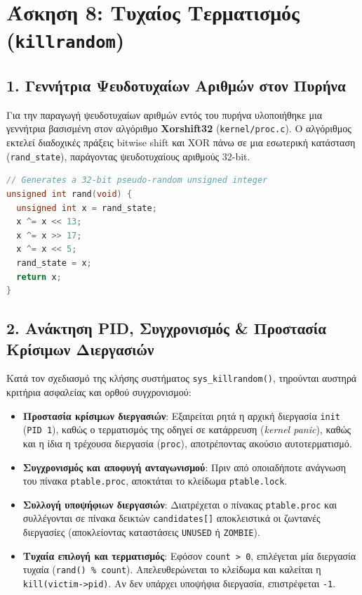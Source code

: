 \documentclass[11pt,a4paper]{article}
\begin{document}
\clearpage
\section{Άσκηση 8: Τυχαίος Τερματισμός (\texttt{killrandom})}


\subsection*{1. Γεννήτρια Ψευδοτυχαίων Αριθμών στον Πυρήνα}
Για την παραγωγή ψευδοτυχαίων αριθμών εντός του πυρήνα υλοποιήθηκε μια γεννήτρια βασισμένη στον αλγόριθμο \textbf{Xorshift32} (\texttt{kernel/proc.c}). 
Ο αλγόριθμος εκτελεί διαδοχικές πράξεις bitwise shift και XOR πάνω σε μια εσωτερική κατάσταση (\texttt{rand\_state}), παράγοντας ψευδοτυχαίους αριθμούς 32-bit.

\begin{lstlisting}[language=C, caption={Υλοποίηση του αλγορίθμου Xorshift32 στο kernel/proc.c}]
// Generates a 32-bit pseudo-random unsigned integer
unsigned int rand(void) {
  unsigned int x = rand_state;
  x ^= x << 13;
  x ^= x >> 17;
  x ^= x << 5;
  rand_state = x;
  return x;
}
\end{lstlisting}

\subsection*{2. Ανάκτηση PID, Συγχρονισμός \& Προστασία Κρίσιμων Διεργασιών}
Κατά τον σχεδιασμό της κλήσης συστήματος \texttt{sys\_killrandom()}, τηρούνται αυστηρά κριτήρια ασφαλείας και ορθού συγχρονισμού:

\begin{itemize}
    \item \textbf{Προστασία κρίσιμων διεργασιών}: Εξαιρείται ρητά η αρχική διεργασία \texttt{init} (\texttt{PID 1}), καθώς ο τερματισμός της οδηγεί σε κατάρρευση (\textit{kernel panic}), 
    καθώς και η ίδια η τρέχουσα διεργασία (\texttt{proc}), αποτρέποντας ακούσιο αυτοτερματισμό.
    \item \textbf{Συγχρονισμός και αποφυγή ανταγωνισμού}: Πριν από οποιαδήποτε ανάγνωση του πίνακα \texttt{ptable.proc}, αποκτάται το κλείδωμα \texttt{ptable.lock}. 
    \item \textbf{Συλλογή υποψήφιων διεργασιών}: Διατρέχεται ο πίνακας \texttt{ptable.proc} και συλλέγονται σε πίνακα δεικτών \texttt{candidates[]} αποκλειστικά οι ζωντανές διεργασίες (αποκλείοντας καταστάσεις \texttt{UNUSED} ή \texttt{ZOMBIE}).
    \item \textbf{Τυχαία επιλογή και τερματισμός}: Εφόσον \texttt{count > 0}, επιλέγεται μία διεργασία τυχαία (\texttt{rand() \% count}). Απελευθερώνεται το κλείδωμα και καλείται η \texttt{kill(victim->pid)}. Αν δεν υπάρχει υποψήφια διεργασία, επιστρέφεται \texttt{-1}.
\end{itemize}
\end{document}
